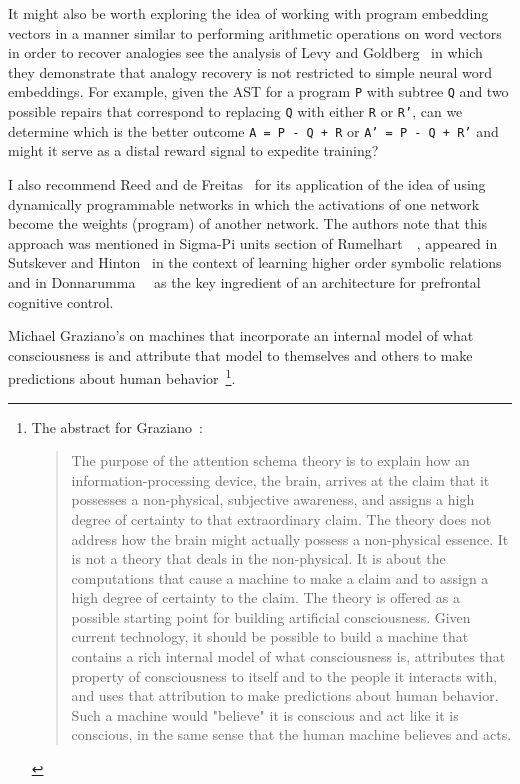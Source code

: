 It might also be worth exploring the idea of working with program embedding vectors in a manner similar to performing arithmetic operations on word vectors in order to recover analogies \emdash{} see the analysis of Levy and Goldberg~\cite{LevyandGoldbergCONIL-14} in which they demonstrate that analogy recovery is not restricted to simple neural word embeddings. For example, given the AST for a program {\tt{P}} with subtree {\tt{Q}} and two possible repairs that correspond to replacing {\tt{Q}} with either {\tt{R}} or {\tt{R'}}, can we determine which is the better outcome {\tt{A = P - Q + R}} or {\tt{A' = P - Q + R'}} and might it serve as a distal reward signal to expedite training?

I also recommend Reed and de Freitas~\cite{ReedandDeFreitasCoRR-15} for its application of the idea of using dynamically programmable networks in which the activations of one network become the weights (program) of another network.  The authors note that this approach was mentioned in Sigma-Pi units section of Rumelhart~\etal{}~\cite{RumelhartetalPDP-86b}, appeared in Sutskever and Hinton~\cite{SutskeverandHintonNIPS-09} in the context of learning higher order symbolic relations and in Donnarumma~\etal{}~\cite{DonnarummaetalIJNS-15} as the key ingredient of an architecture for prefrontal cognitive control.




Michael Graziano's {} on machines that incorporate an internal model of what consciousness is and attribute that model to themselves and others to make predictions about human behavior~\cite{GrazianoFiRAI-17}\footnote{%
%
  The abstract for Graziano~\cite{GrazianoFiRAI-17}:
%
  \begin{quotation}
%
   The purpose of the attention schema theory is to explain how an information-processing device, the brain, arrives at the claim that it possesses a non-physical, subjective awareness, and assigns a high degree of certainty to that extraordinary claim. The theory does not address how the brain might actually possess a non-physical essence. It is not a theory that deals in the non-physical. It is about the computations that cause a machine to make a claim and to assign a high degree of certainty to the claim. The theory is offered as a possible starting point for building artificial consciousness. Given current technology, it should be possible to build a machine that contains a rich internal model of what consciousness is, attributes that property of consciousness to itself and to the people it interacts with, and uses that attribution to make predictions about human behavior. Such a machine would "believe" it is conscious and act like it is conscious, in the same sense that the human machine believes and acts.
%
  \end{quotation}}.

